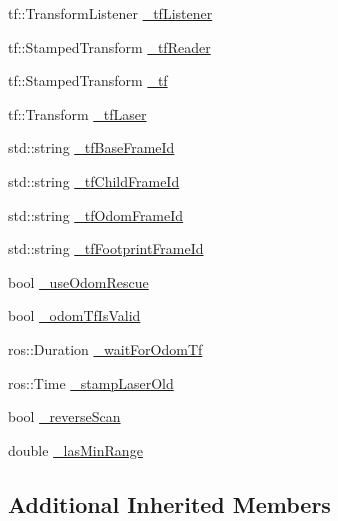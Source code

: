 \begin{DoxyCompactItemize}
\item 
tf\-::\-Transform\-Listener \hyperlink{classohm__tsd__slam__ref_1_1ThreadLocalize_a224fab0e74f4e79a3bd7477c7ba67927}{\-\_\-tf\-Listener}
\item 
tf\-::\-Stamped\-Transform \hyperlink{classohm__tsd__slam__ref_1_1ThreadLocalize_ad6eb4ec2cbb72976a751195aaa87b230}{\-\_\-tf\-Reader}
\item 
tf\-::\-Stamped\-Transform \hyperlink{classohm__tsd__slam__ref_1_1ThreadLocalize_a58c3e63ca51b4f667361138ca9612a43}{\-\_\-tf}
\item 
tf\-::\-Transform \hyperlink{classohm__tsd__slam__ref_1_1ThreadLocalize_a865325fdc2badfde0512622d52d60f46}{\-\_\-tf\-Laser}
\item 
std\-::string \hyperlink{classohm__tsd__slam__ref_1_1ThreadLocalize_ab83a495abfe38788855cd283334052ee}{\-\_\-tf\-Base\-Frame\-Id}
\item 
std\-::string \hyperlink{classohm__tsd__slam__ref_1_1ThreadLocalize_a15312866770a11e59f0e2e260a5d8c05}{\-\_\-tf\-Child\-Frame\-Id}
\item 
std\-::string \hyperlink{classohm__tsd__slam__ref_1_1ThreadLocalize_a4f3c79f1893a406885983bd8984954e2}{\-\_\-tf\-Odom\-Frame\-Id}
\item 
std\-::string \hyperlink{classohm__tsd__slam__ref_1_1ThreadLocalize_a49f36ec368f39a906125435adb7fa231}{\-\_\-tf\-Footprint\-Frame\-Id}
\item 
bool \hyperlink{classohm__tsd__slam__ref_1_1ThreadLocalize_a50a25580c50a3b14d04a548416142d6c}{\-\_\-use\-Odom\-Rescue}
\item 
bool \hyperlink{classohm__tsd__slam__ref_1_1ThreadLocalize_a60894678d5815e42124c78eef219cf8b}{\-\_\-odom\-Tf\-Is\-Valid}
\item 
ros\-::\-Duration \hyperlink{classohm__tsd__slam__ref_1_1ThreadLocalize_a5f43425ab2bb540e72205ef83e37d4ff}{\-\_\-wait\-For\-Odom\-Tf}
\item 
ros\-::\-Time \hyperlink{classohm__tsd__slam__ref_1_1ThreadLocalize_a3993fb6424dd9af667ddf0b14cdf2fe4}{\-\_\-stamp\-Laser\-Old}
\item 
bool \hyperlink{classohm__tsd__slam__ref_1_1ThreadLocalize_a176899f67fbf706a756853a8af968fd5}{\-\_\-reverse\-Scan}
\item 
double \hyperlink{classohm__tsd__slam__ref_1_1ThreadLocalize_a6170ca0dd6108536689c4dab3f7425f6}{\-\_\-las\-Min\-Range}
\end{DoxyCompactItemize}
\subsection*{Additional Inherited Members}


